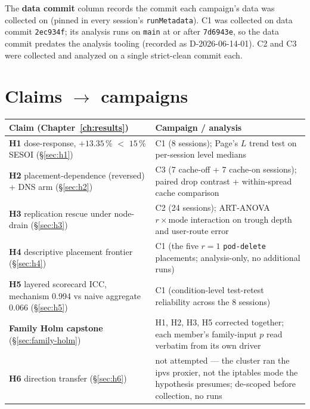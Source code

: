 The \textbf{data commit} column records the commit each campaign's data was
collected on (pinned in every session's \texttt{runMetadata}). C1 was collected
on data commit \texttt{2ec934f}; its analysis runs on \texttt{main} at or after
\texttt{7d6943e}, so the data commit predates the analysis tooling
(recorded as D-2026-06-14-01). C2 and C3 were collected and analyzed on a single
strict-clean commit each.

\section{Claims \texorpdfstring{$\rightarrow$}{to} campaigns}\label{sec:claims-runs}

\begin{center}
\footnotesize
\begin{tabular}{p{}p{}}
\toprule
\textbf{Claim (Chapter~\ref{ch:results})} & \textbf{Campaign / analysis} \\
\midrule
\textbf{H1} dose-response, $+13.35\,\%$ $<$ $15\,\%$ SESOI (\S\ref{sec:h1}) & C1 (8 sessions); Page's $L$ trend test on per-session level medians \\
\addlinespace
\textbf{H2} placement-dependence (reversed) + DNS arm (\S\ref{sec:h2}) & C3 (7 cache-off + 7 cache-on sessions); paired drop contrast + within-spread cache comparison \\
\addlinespace
\textbf{H3} replication rescue under node-drain (\S\ref{sec:h3}) & C2 (24 sessions); ART-ANOVA $r\times\text{mode}$ interaction on trough depth and user-route error \\
\addlinespace
\textbf{H4} descriptive placement frontier (\S\ref{sec:h4}) & C1 (the five $r{=}1$ \texttt{pod-delete} placements; analysis-only, no additional runs) \\
\addlinespace
\textbf{H5} layered scorecard ICC, mechanism 0.994 vs naive aggregate 0.066 (\S\ref{sec:h5}) & C1 (condition-level test-retest reliability across the 8 sessions) \\
\addlinespace
\textbf{Family Holm capstone} (\S\ref{sec:family-holm}) & H1, H2, H3, H5 corrected together; each member's family-input $p$ read verbatim from its own driver \\
\addlinespace
\textbf{H6} direction transfer (\S\ref{sec:h6}) & not attempted --- the cluster ran the ipvs proxier, not the iptables mode the hypothesis presumes; de-scoped before collection, no runs \\
\bottomrule
\end{tabular}
\end{center}

